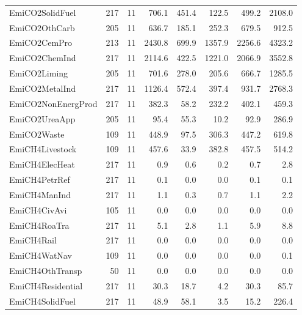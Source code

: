 {\begin{tabular}[t]{lrrrrrrr}
EmiCO2SolidFuel & 217 & 11 & \num{706.1} & \num{451.4} & \num{122.5} & \num{499.2} & \num{2108.0}\\
EmiCO2OthCarb & 205 & 11 & \num{636.7} & \num{185.1} & \num{252.3} & \num{679.5} & \num{912.5}\\
EmiCO2CemPro & 213 & 11 & \num{2430.8} & \num{699.9} & \num{1357.9} & \num{2256.6} & \num{4323.2}\\
EmiCO2ChemInd & 217 & 11 & \num{2114.6} & \num{422.5} & \num{1221.0} & \num{2066.9} & \num{3552.8}\\
EmiCO2Liming & 205 & 11 & \num{701.6} & \num{278.0} & \num{205.6} & \num{666.7} & \num{1285.5}\\
EmiCO2MetalInd & 217 & 11 & \num{1126.4} & \num{572.4} & \num{397.4} & \num{931.7} & \num{2768.3}\\
EmiCO2NonEnergProd & 217 & 11 & \num{382.3} & \num{58.2} & \num{232.2} & \num{402.1} & \num{459.3}\\
EmiCO2UreaApp & 205 & 11 & \num{95.4} & \num{55.3} & \num{10.2} & \num{92.9} & \num{286.9}\\
EmiCO2Waste & 109 & 11 & \num{448.9} & \num{97.5} & \num{306.3} & \num{447.2} & \num{619.8}\\
EmiCH4Livestock & 109 & 11 & \num{457.6} & \num{33.9} & \num{382.8} & \num{457.5} & \num{514.2}\\
EmiCH4ElecHeat & 217 & 11 & \num{0.9} & \num{0.6} & \num{0.2} & \num{0.7} & \num{2.8}\\
EmiCH4PetrRef & 217 & 11 & \num{0.1} & \num{0.0} & \num{0.0} & \num{0.1} & \num{0.1}\\
EmiCH4ManInd & 217 & 11 & \num{1.1} & \num{0.3} & \num{0.7} & \num{1.1} & \num{2.2}\\
EmiCH4CivAvi & 105 & 11 & \num{0.0} & \num{0.0} & \num{0.0} & \num{0.0} & \num{0.0}\\
EmiCH4RoaTra & 217 & 11 & \num{5.1} & \num{2.8} & \num{1.1} & \num{5.9} & \num{8.8}\\
EmiCH4Rail & 217 & 11 & \num{0.0} & \num{0.0} & \num{0.0} & \num{0.0} & \num{0.0}\\
EmiCH4WatNav & 109 & 11 & \num{0.0} & \num{0.0} & \num{0.0} & \num{0.0} & \num{0.1}\\
EmiCH4OthTransp & 50 & 11 & \num{0.0} & \num{0.0} & \num{0.0} & \num{0.0} & \num{0.0}\\
EmiCH4Residential & 217 & 11 & \num{30.3} & \num{18.7} & \num{4.2} & \num{30.3} & \num{85.7}\\
EmiCH4SolidFuel & 217 & 11 & \num{48.9} & \num{58.1} & \num{3.5} & \num{15.2} & \num{226.4}\\

\end{tabular}}
